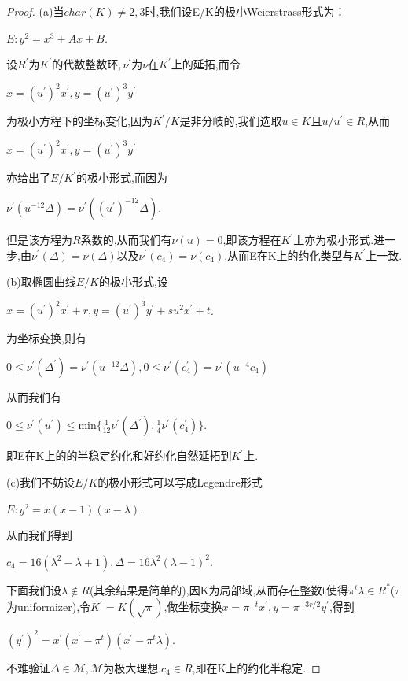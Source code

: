 \documentclass[11pt]{ctexart}
\begin{document}
\begin{proof}(a)当$char(K)\neq 2,3$时,我们设E/K的极小Weierstrass形式为：
\begin{center}
    $E:y^2=x^3+Ax+B$.
\end{center}

设$R^{\prime}$为$K^{\prime}$的代数整数环$,\nu^{\prime}$为$\nu$在$K^{\prime}$上的延拓,而令
\begin{center}
    $x=(u^{\prime})^2x^{\prime},y=(u^{\prime})^3y^{\prime}$
\end{center}
为极小方程下的坐标变化,因为$K^{\prime}/K$是非分岐的,我们选取$u\in K$且$u/u^{\prime} \in R$,从而
\begin{center}
    $x=(u^{\prime})^2x^{\prime},y=(u^{\prime})^3y^{\prime}$
\end{center}
亦给出了$E/K^{\prime}$的极小形式,而因为
\begin{center}
    $\nu^{\prime}(u^{-12}\Delta)=\nu^{\prime}((u^{\prime})^{-12}\Delta)$.
\end{center}
但是该方程为$R$系数的,从而我们有$\nu(u)=0$,即该方程在$K^{\prime}$上亦为极小形式.进一步,由$\nu^{\prime}(\Delta)=\nu(\Delta)$以及$\nu^{\prime}(c_4)=\nu(c_4)$,从而E在K上的约化类型与$K^{\prime}$上一致.

(b)取椭圆曲线$E/K$的极小形式,设
\begin{center}
    $x=(u^{\prime})^2x^{\prime}+r,y=(u^{\prime})^3y^{\prime}+su^2x^{\prime}+t$.
\end{center}
为坐标变换,则有
\begin{center}
    $0\leqslant \nu^{\prime}(\Delta^{\prime}) = \nu^{\prime}(u^{-12}\Delta) $$,0\leqslant \nu^{\prime}(c_4^{\prime}) = \nu^{\prime}(u^{-4}c_4) $
\end{center}
从而我们有
\begin{center}
    $0\leqslant \nu^{\prime}(u^{\prime})\leqslant $min$\{\frac{1}{12}\nu^{\prime}(\Delta^{\prime}),\frac{1}{4}\nu^{\prime}(c_4^{\prime})\}$.
\end{center}
即E在K上的的半稳定约化和好约化自然延拓到$K^{\prime}$上.

(c)我们不妨设$E/K$的极小形式可以写成Legendre形式
\begin{center}
    $E:y^2=x(x-1)(x-\lambda)$.
\end{center}
从而我们得到
\begin{center}
    $c_4=16(\lambda^2-\lambda+1),\Delta =16\lambda^2(\lambda-1)^2$.
\end{center}
下面我们设$\lambda\notin R$(其余结果是简单的),因K为局部域,从而存在整数t使得$\pi^{t}\lambda\in R^{*}$($\pi$为uniformizer),令$K^{\prime}=K(\sqrt{\pi})$,做坐标变换$x=\pi^{-t}x^{\prime}$$,y=\pi^{-3r/2}y^{\prime}$,得到
\begin{center}
    $(y^{\prime})^2=x^{\prime}(x^{\prime}-\pi^t)(x^{\prime}-\pi^t\lambda)$.
\end{center}
不难验证$\Delta\in\mathcal{M},\mathcal{M}$为极大理想.$c_4 \in R$,即在K上的约化半稳定.
\end{proof}
\end{document}
